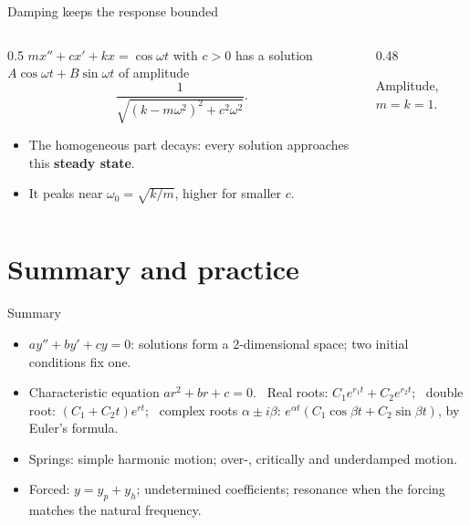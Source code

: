 \documentclass[10pt]{wosm-slides}
\begin{document}
\begin{frame}{Damping keeps the response bounded}
  \begin{columns}[c]
    \begin{column}{0.5\textwidth}
      $m x'' + c x' + k x = \cos\omega t$ with $c > 0$ has a solution $A\cos\omega t + B\sin\omega t$ of
      amplitude
      \[ \frac{1}{\sqrt{(k - m\omega^2)^2 + c^2\omega^2}} . \]
      \pause
      \begin{itemize}
        \item The homogeneous part decays: every solution approaches this \textbf{steady state}.
        \item It peaks near $\omega_0 = \sqrt{k/m}$, higher for smaller $c$.
      \end{itemize}
    \end{column}
    \begin{column}{0.48\textwidth}
      \centering
      \par\small Amplitude, $m = k = 1$.
    \end{column}
  \end{columns}
\end{frame}

\section{Summary and practice}

\begin{frame}{Summary}
  \begin{itemize}
    \item $a y'' + b y' + c y = 0$: solutions form a $2$-dimensional space; two initial conditions fix one.
    \item Characteristic equation $ar^2 + br + c = 0$. \ Real roots: $C_1 e^{r_1 t} + C_2 e^{r_2 t}$; \
      double root: $(C_1 + C_2 t) e^{rt}$; \ complex roots $\alpha \pm i\beta$:
      $e^{\alpha t}(C_1\cos\beta t + C_2\sin\beta t)$, by Euler's formula.
    \item Springs: simple harmonic motion; over-, critically and underdamped motion.
    \item Forced: $y = y_p + y_h$; undetermined coefficients; resonance when the forcing matches the
      natural frequency.
  \end{itemize}
\end{frame}
\end{document}
